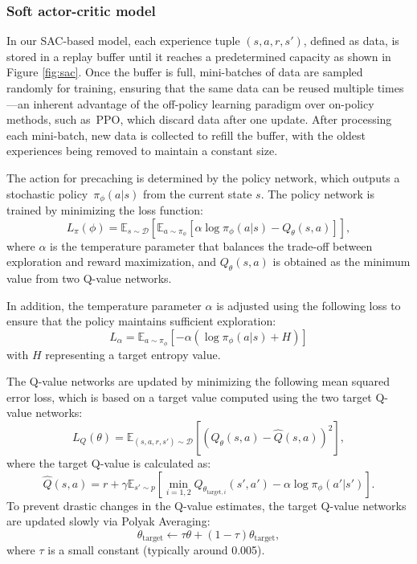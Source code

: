 \documentclass{aims}
\numberwithin{equation}{section}
\begin{document}
\subsubsection{Soft actor-critic model}



In our SAC-based model, each experience tuple $(s, a, r, s')$, defined as data, is stored in a replay buffer until it reaches a predetermined capacity as shown in Figure \ref{fig:sac}.
Once the buffer is full, mini-batches of data are sampled randomly for training, ensuring that the same data can be reused multiple times—an inherent advantage of the off-policy learning paradigm over on-policy methods, such as~PPO, which discard data after one update.
After processing each mini-batch, new data is collected to refill the buffer, with the oldest experiences being removed to maintain a constant size.

The action for precaching is determined by the policy network, which outputs a stochastic policy~$\pi_{\phi}(a|s)$ from the current state $s$. The policy network is trained by minimizing the loss function:
\begin{equation}
    L_{\pi}(\phi) = \mathbb{E}_{s \sim \mathcal{D}} \left[ \mathbb{E}_{a \sim \pi_{\phi}} \left[ \alpha \log \pi_{\phi}(a|s) - Q_{\theta}(s, a) \right] \right],
\end{equation}
where 
$\alpha$ is the temperature parameter that balances the trade-off between exploration and reward maximization, and $Q_{\theta}(s, a)$ is obtained as the minimum value from two Q-value networks.

In addition, the temperature parameter $\alpha$ is adjusted using the following loss to ensure that the policy maintains sufficient exploration: 
\begin{equation}
    L_{\alpha} = \mathbb{E}_{a \sim \pi_{\phi}} \left[ -\alpha \left( \log \pi_{\phi}(a|s) + H \right) \right]
\end{equation}
with $H$ representing a target entropy value.

The Q-value networks are updated by minimizing the following mean squared error loss, which is based on a target value computed using the two target Q-value networks:
\begin{equation}
    L_Q(\theta) = \mathbb{E}_{(s,a,r,s') \sim \mathcal{D}} \left[ \left( Q_{\theta}(s,a) - \hat{Q}(s,a) \right)^2 \right],
\end{equation}
where the target Q-value is calculated as:
\begin{equation}
    \hat{Q}(s,a) = r + \gamma \mathbb{E}_{s' \sim p} \left[ \min_{i=1,2} Q_{\theta_{\text{target},i}}(s', a') - \alpha \log \pi_{\phi}(a'|s') \right].
\end{equation}
To prevent drastic changes in the Q-value estimates, the target Q-value networks are updated slowly via Polyak Averaging:
\begin{equation}
    \theta_{\text{target}} \leftarrow \tau \theta + (1 - \tau) \theta_{\text{target}},
\end{equation}
where $\tau$ is a small constant (typically around 0.005).
\end{document}
